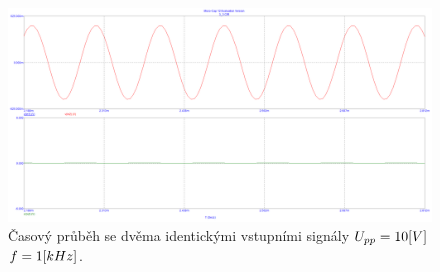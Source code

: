 \documentclass{article}
\begin{document}
\begin{figure}[H]
  \begin{minipage}[t]{\textwidth}
    \centering
    \includegraphics[width=\textwidth]{PC/ukol3/nula_vzstup.png}
    Časový průběh se dvěma identickými vstupními signály \(U_{pp} = 10\-[V]\) \(f = 1\-[kHz]\).
  \end{minipage}
\end{figure}
\end{document}
